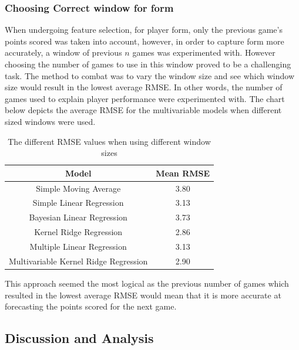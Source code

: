 \documentclass[a4paper,11pt,twoside]{article}
\begin{document}
\subsubsection{Choosing Correct window for form}
When undergoing feature selection, for player form, only the previous game's points scored was taken into account, however, in order to capture form more accurately, a window of previous $n$ games was experimented with. However choosing the number of games to use in this window proved to be a challenging task. The method to combat was to vary the window size and see which window size would result in the lowest average RMSE. In other words, the number of games used to explain player performance were experimented with. The chart below depicts the average RMSE for the multivariable models when different sized windows were used. 
\vspace{5mm}
\begin{table}[h!]
\captionsetup{justification=centering}
\begin{center}
\begin{tabular}{ |c|c|} 
 \hline
     \textbf{Model} & \textbf{Mean RMSE}\\ 
 \hline
 Simple Moving Average  & 3.80\\ 
 \hline
 Simple Linear Regression & 3.13\\ 
 \hline
 Bayesian Linear Regression  & 3.73 \\
 \hline
 Kernel Ridge Regression  & 2.86\\
 \hline
 Multiple Linear Regression& 3.13\\
 \hline
 Multivariable Kernel Ridge Regression  & 2.90\\
 \hline
\end{tabular}
\end{center}
\caption{The different RMSE values when using different window sizes}
\end{table}
\vspace{5mm}

This approach seemed the most logical as the previous number of games which resulted in the lowest average RMSE would mean that it is more accurate at forecasting the points scored for the next game.

\subsection{Discussion and Analysis}
\end{document}
